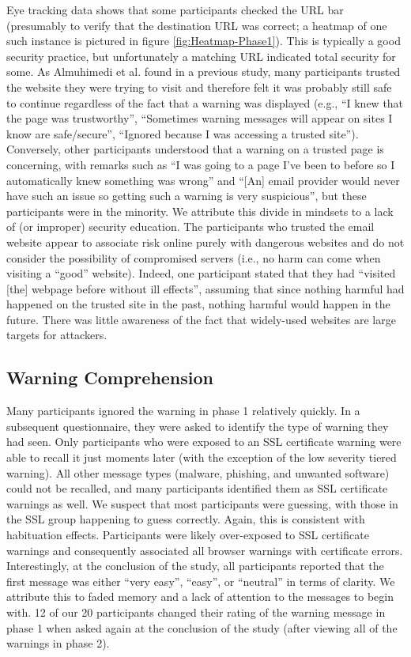 Eye tracking data shows that some participants checked the URL bar (presumably to verify that the destination URL was correct; a heatmap of one such instance is pictured in figure \ref{fig:Heatmap-Phase1}). This is typically a good security practice, but unfortunately a matching URL indicated total security for some. As Almuhimedi et al. \cite{almuhimedi2014reputation} found in a previous study, many participants trusted the website they were trying to visit and therefore felt it was probably still safe to continue regardless of the fact that a warning was displayed (e.g., ``I knew that the page was trustworthy'', ``Sometimes warning messages will appear on sites I know are safe/secure'', ``Ignored because I was accessing a trusted site''). Conversely, other participants understood that a warning on a trusted page is concerning, with remarks such as ``I was going to a page I've been to before so I automatically knew something was wrong'' and ``[An] email provider would never have such an issue so getting such a warning is very suspicious'', but these participants were in the minority. We attribute this divide in mindsets to a lack of (or improper) security education. The participants who trusted the email website appear to associate risk online purely with dangerous websites and do not consider the possibility of compromised servers (i.e., no harm can come when visiting a ``good'' website). Indeed, one participant stated that they had ``visited [the] webpage before without ill effects'', assuming that since nothing harmful had happened on the trusted site in the past, nothing harmful would happen in the future. There was little awareness of the fact that widely-used websites are large targets for attackers.

\subsection{Warning Comprehension}
Many participants ignored the warning in phase 1 relatively quickly. In a subsequent questionnaire, they were asked to identify the type of warning they had seen. Only participants who were exposed to an SSL certificate warning were able to recall it just moments later (with the exception of the low severity tiered warning). All other message types (malware, phishing, and unwanted software) could not be recalled, and many participants identified them as SSL certificate warnings as well. We suspect that most participants were guessing, with those in the SSL group happening to guess correctly. Again, this is consistent with habituation effects. Participants were likely over-exposed to SSL certificate warnings and consequently associated all browser warnings with certificate errors. Interestingly, at the conclusion of the study, all participants reported that the first message was either ``very easy'', ``easy'', or ``neutral'' in terms of clarity. We attribute this to faded memory and a lack of attention to the messages to begin with. 12 of our 20 participants changed their rating of the warning message in phase 1 when asked again at the conclusion of the study (after viewing all of the warnings in phase 2).


